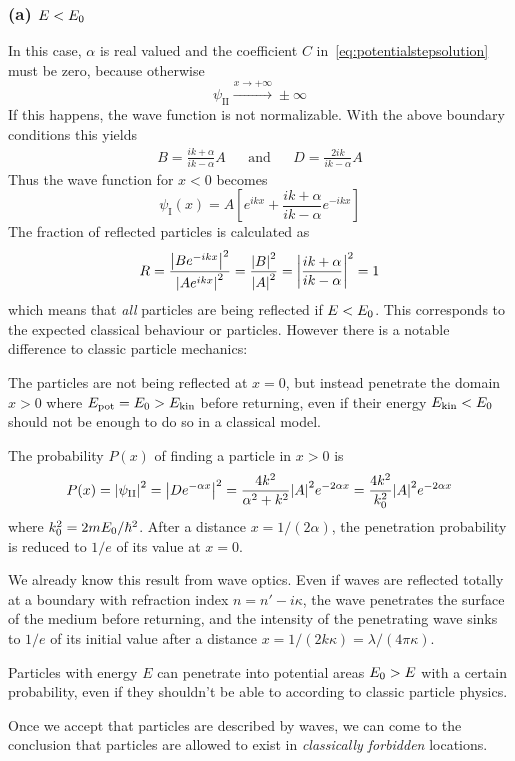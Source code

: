 \documentclass[../../script.tex]{subfiles}
\begin{document}
\subsubsection{(a) $E < E_{\text{0}}$}
In this case, $\alpha$ is real valued and the coefficient $C$ in~\eqref{eq:potentialstepsolution} must be zero, because otherwise
\[
	\psi_{\text{II}} \xrightarrow{x \rightarrow +\infty} \pm\infty
\]
If this happens, the wave function is not normalizable. With the above boundary conditions this yields
\begin{align}
	B = \frac{ik + \alpha}{ik - \alpha}A && \text{and} && D = \frac{2ik}{ik - \alpha} A
\end{align}
Thus the wave function for $x < 0$ becomes 
\begin{equation}
	\psi_{\text{I}}(x) = A \left[ e^{ikx} + \frac{ik + \alpha}{ik - \alpha}e^{-ikx} \right]
\end{equation}
The fraction of reflected particles is calculated as 
\begin{equation}\label{eq:reflectioncoefffirst}
	R = \frac{\abs{Be^{-ikx}}^2}{\abs{Ae^{ikx}}^2} = \frac{\abs{B}^2}{\abs{A}^2} = \abs{\frac{ik + \alpha}{ik - \alpha}}^2 = 1
\end{equation}
which means that \textit{all} particles are being reflected if $E < E_{\text{0}}$. This corresponds to the expected classical behaviour or particles.
However there is a notable difference to classic particle mechanics:
\begin{tcolorbox}
	The particles are not being reflected at $x = 0$, but instead penetrate the domain $x > 0$ where $E_{\text{pot}} = E_{\text{0}} > E_{\text{kin}}$ before returning,
	even if their energy $E_{\text{kin}} < E_{\text{0}}$ should not be enough to do so in a classical model.
\end{tcolorbox}
The probability $P(x)$ of finding a particle in $x > 0$ is 
\begin{equation}
	P(x) = \abs{\psi_{\text{II}}}^2 = \abs{De^{-\alpha x}}^2 = \frac{4k^2}{\alpha^2 + k^2} \abs{A}^2 e^{-2\alpha x} = \frac{4k^2}{k_0^2} \abs{A}^2 e^{-2\alpha x}
\end{equation}
where $k_0^2 = 2mE_{\text{0}} / \hbar^2$. After a distance $x = 1/(2\alpha)$, the penetration probability is reduced to $1/e$ of its value at $x = 0$.

We already know this result from wave optics. Even if waves are reflected totally at a boundary with refraction index $n = n' - i\kappa$, the wave penetrates the surface of the medium before returning, and the intensity
of the penetrating wave sinks to $1/e$ of its initial value after a distance $x = 1/(2k\kappa) = \lambda/(4\pi\kappa)$.
\begin{tcolorbox}
	Particles with energy $E$ can penetrate into potential areas $E_{\text{0}} > E$ with a certain probability, even if they shouldn't be able to according to classic particle physics.
\end{tcolorbox}
Once we accept that particles are described by waves, we can come to the conclusion that particles are allowed to exist in \textit{classically forbidden} locations.
\end{document}
